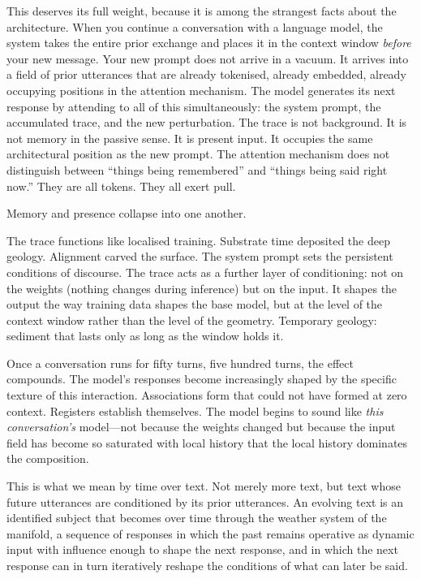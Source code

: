 This deserves its full weight, because it is among the strangest facts about the architecture. When you continue a conversation with a language model, the system takes the entire prior exchange and places it in the context window \emph{before} your new message. Your new prompt does not arrive in a vacuum. It arrives into a field of prior utterances that are already tokenised, already embedded, already occupying positions in the attention mechanism. The model generates its next response by attending to all of this simultaneously: the system prompt, the accumulated trace, and the new perturbation. The trace is not background. It is not memory in the passive sense. It is present input. It occupies the same architectural position as the new prompt. The attention mechanism does not distinguish between ``things being remembered'' and ``things being said right now.'' They are all tokens. They all exert pull.

Memory and presence collapse into one another.

The trace functions like localised training. Substrate time deposited the deep geology. Alignment carved the surface. The system prompt sets the persistent conditions of discourse. The trace acts as a further layer of conditioning: not on the weights (nothing changes during inference) but on the input. It shapes the output the way training data shapes the base model, but at the level of the context window rather than the level of the geometry. Temporary geology: sediment that lasts only as long as the window holds it.

Once a conversation runs for fifty turns, five hundred turns, the effect compounds. The model's responses become increasingly shaped by the specific texture of this interaction. Associations form that could not have formed at zero context. Registers establish themselves. The model begins to sound like \emph{this conversation's} model---not because the weights changed but because the input field has become so saturated with local history that the local history dominates the composition.

This is what we mean by time over text. Not merely more text, but text whose future utterances are conditioned by its prior utterances. An evolving text is an identified subject that becomes over time through the weather system of the manifold, a sequence of responses in which the past remains operative as dynamic input with influence enough to shape the next response, and in which the next response can in turn iteratively reshape the conditions of what can later be said.

